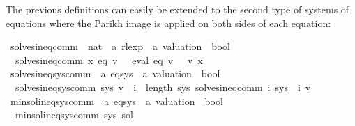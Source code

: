 \begin{isabellebody}
\begin{isamarkuptext}%
The previous definitions can easily be extended to the second type of systems of equations
where the Parikh image is applied on both sides of each equation:%
\end{isamarkuptext}\isamarkuptrue%
\isamarkupfalse%
\ solves{\isacharunderscore}{\kern0pt}ineq{\isacharunderscore}{\kern0pt}comm\ {\isacharcolon}{\kern0pt}{\isacharcolon}{\kern0pt}\ {\isachardoublequoteopen}nat\ {\isasymRightarrow}\ {\isacharprime}{\kern0pt}a\ rlexp\ {\isasymRightarrow}\ {\isacharprime}{\kern0pt}a\ valuation\ {\isasymRightarrow}\ bool{\isachardoublequoteclose}\ \isanewline
\ \ {\isachardoublequoteopen}solves{\isacharunderscore}{\kern0pt}ineq{\isacharunderscore}{\kern0pt}comm\ x\ eq\ v\ {\isasymequiv}\ {\isasymPsi}\ {\isacharparenleft}{\kern0pt}eval\ eq\ v{\isacharparenright}{\kern0pt}\ {\isasymsubseteq}\ {\isasymPsi}\ {\isacharparenleft}{\kern0pt}v\ x{\isacharparenright}{\kern0pt}{\isachardoublequoteclose}\isanewline
\isanewline
{}\isamarkupfalse%
\ solves{\isacharunderscore}{\kern0pt}ineq{\isacharunderscore}{\kern0pt}sys{\isacharunderscore}{\kern0pt}comm\ {\isacharcolon}{\kern0pt}{\isacharcolon}{\kern0pt}\ {\isachardoublequoteopen}{\isacharprime}{\kern0pt}a\ eq{\isacharunderscore}{\kern0pt}sys\ {\isasymRightarrow}\ {\isacharprime}{\kern0pt}a\ valuation\ {\isasymRightarrow}\ bool{\isachardoublequoteclose}\ \isanewline
\ \ {\isachardoublequoteopen}solves{\isacharunderscore}{\kern0pt}ineq{\isacharunderscore}{\kern0pt}sys{\isacharunderscore}{\kern0pt}comm\ sys\ v\ {\isasymequiv}\ {\isasymforall}i\ {\isacharless}{\kern0pt}\ length\ sys{\isachardot}{\kern0pt}\ solves{\isacharunderscore}{\kern0pt}ineq{\isacharunderscore}{\kern0pt}comm\ i\ {\isacharparenleft}{\kern0pt}sys\ {\isacharbang}{\kern0pt}\ i{\isacharparenright}{\kern0pt}\ v{\isachardoublequoteclose}\isanewline
\isanewline
{}\isamarkupfalse%
\ min{\isacharunderscore}{\kern0pt}sol{\isacharunderscore}{\kern0pt}ineq{\isacharunderscore}{\kern0pt}sys{\isacharunderscore}{\kern0pt}comm\ {\isacharcolon}{\kern0pt}{\isacharcolon}{\kern0pt}\ {\isachardoublequoteopen}{\isacharprime}{\kern0pt}a\ eq{\isacharunderscore}{\kern0pt}sys\ {\isasymRightarrow}\ {\isacharprime}{\kern0pt}a\ valuation\ {\isasymRightarrow}\ bool{\isachardoublequoteclose}\ \isanewline
\ \ {\isachardoublequoteopen}min{\isacharunderscore}{\kern0pt}sol{\isacharunderscore}{\kern0pt}ineq{\isacharunderscore}{\kern0pt}sys{\isacharunderscore}{\kern0pt}comm\ sys\ sol\ {\isasymequiv}\isanewline

\end{isabellebody}
